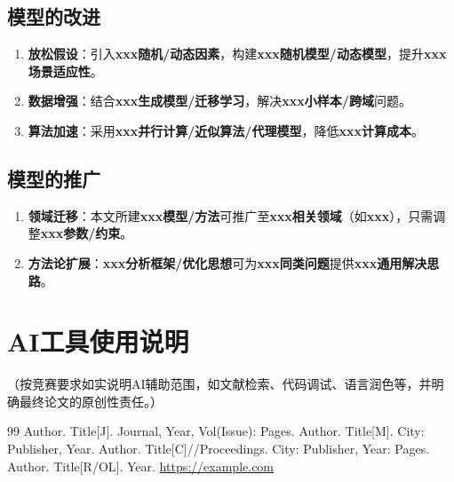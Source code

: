 \documentclass[draft,12pt,a4paper]{ctexart}
\theoremstyle{definition}
\begin{document}
\subsection{模型的改进}
\begin{enumerate}[itemsep=1pt]
  \item \textbf{放松假设}：引入\textbf{xxx随机/动态因素}，构建\textbf{xxx随机模型/动态模型}，提升\textbf{xxx场景适应性}。
  \item \textbf{数据增强}：结合\textbf{xxx生成模型/迁移学习}，解决\textbf{xxx小样本/跨域}问题。
  \item \textbf{算法加速}：采用\textbf{xxx并行计算/近似算法/代理模型}，降低\textbf{xxx计算成本}。
\end{enumerate}

\subsection{模型的推广}
\begin{enumerate}[itemsep=1pt]
  \item \textbf{领域迁移}：本文所建\textbf{xxx模型/方法}可推广至\textbf{xxx相关领域}（如\textbf{xxx}），只需调整\textbf{xxx参数/约束}。
  \item \textbf{方法论扩展}：\textbf{xxx分析框架/优化思想}可为\textbf{xxx同类问题}提供\textbf{xxx通用解决思路}。
\end{enumerate}

\section{AI工具使用说明}
（按竞赛要求如实说明AI辅助范围，如文献检索、代码调试、语言润色等，并明确最终论文的原创性责任。）

\newpage
\begin{thebibliography}{99}
   Author. Title[J]. Journal, Year, Vol(Issue): Pages.
   Author. Title[M]. City: Publisher, Year.
   Author. Title[C]//Proceedings. City: Publisher, Year: Pages.
   Author. Title[R/OL]. Year. \url{https://example.com}
\end{thebibliography}

\newpage
\appendix
{}
\renewcommand{\figurename}{附图}
\renewcommand{\tablename}{附表}
\setcounter{figure}{0}
\setcounter{table}{0}
\end{document}
